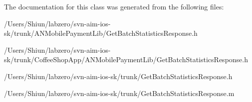 The documentation for this class was generated from the following files:\begin{DoxyCompactItemize}
\item 
/Users/Shiun/labzero/svn-\/aim-\/ios-\/sk/trunk/ANMobilePaymentLib/GetBatchStatisticsResponse.h\item 
/Users/Shiun/labzero/svn-\/aim-\/ios-\/sk/trunk/CoffeeShopApp/ANMobilePaymentLib/GetBatchStatisticsResponse.h\item 
/Users/Shiun/labzero/svn-\/aim-\/ios-\/sk/trunk/GetBatchStatisticsResponse.h\item 
/Users/Shiun/labzero/svn-\/aim-\/ios-\/sk/trunk/GetBatchStatisticsResponse.m\end{DoxyCompactItemize}

